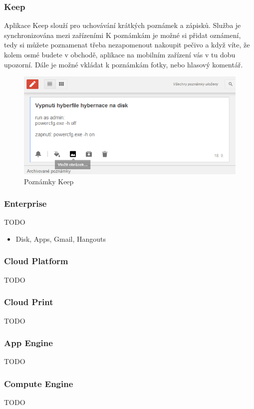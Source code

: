 \subsubsection{Keep}
Aplikace Keep slouží pro uchovávání krátkých poznámek a zápisků. Služba je synchronizována mezi zařízeními K poznámkám je možné si přidat oznámení, tedy si můžete poznamenat třeba nezapomenout nakoupit pečivo a když víte, že kolem osmé budete v obchodě, aplikace na mobilním zařízení vás v tu dobu upozorní. Dále je možné vkládat k poznámkám fotky, nebo hlasový komentář.
\begin{figure}[htbp]
	\centering
		\includegraphics[width=1.00\textwidth]{ext/googleKeep.png}
	\caption{Poznámky Keep}
	\label{fig:googleKeep}
\end{figure}

\subsubsection{Enterprise}
TODO
\begin{itemize}
	\item Disk, Apps, Gmail, Hangouts
\end{itemize}

\subsubsection{Cloud Platform}
TODO

\subsubsection{Cloud Print}
TODO

\subsubsection{App Engine}
TODO

\subsubsection{Compute Engine}
TODO

